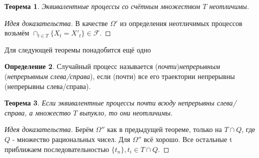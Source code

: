 \documentclass[16pt]{article}
\newtheorem{theorem}{Теорема}[section]
\theoremstyle{definition}
\newtheorem{definition}[theorem]{Определение}
\begin{document}
\begin{theorem}
Эквивалентные процессы со счётным множеством $T$ неотличимы.
\end{theorem}
\begin{proof}[Идея доказательства]
В качестве $\Omega'$ из определения неотличимых процессов возьмём $\cap_{t \in T}\{X_t = X'_t\} \in \mathcal{F}$.
\end{proof}
Для следующей теоремы понадобится ещё одно
\begin{definition}
Случайный процесс называется (\textit{почти})\textit{непрерывным} (\textit{непрерывным слева/справа}), если (почти) все его траектории непрерывны (непрерывны слева/справа).
\end{definition}
\begin{theorem}
Если эквивалентные процессы почти всюду непрерывны слева/справа, а множество $T$ выпукло, то они неотличимы.
\end{theorem}
\begin{proof}[Идея доказательства]
Берём $\Omega''$ как в предыдущей теореме, только на $T \cap Q$, где $Q$ - множество рациональных чисел. Для $\Omega''$ всё хорошо. Все остальные t приближаем последовательностью $\{t_n\}, t_i \in T \cap Q$. 
\end{proof}
\end{document}

